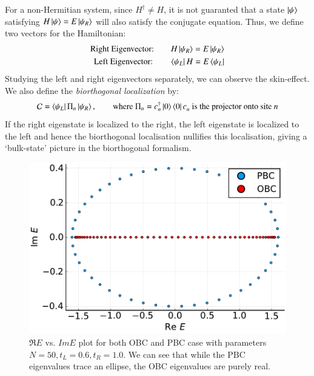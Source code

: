 For a non-Hermitian system, since $H^\dagger\neq H$, it is not guaranted that a state $\ket{\psi}$ satisfying $H\ket{\psi} = E\ket{\psi_R}$ will also satisfy the conjugate equation. Thus, we define two vectors for the Hamiltonian:
\begin{align*}
    \text{Right Eigenvector:\qquad} H\ket{\psi_R} = E\ket{\psi_R}\\
    \text{Left Eigenvector:\qquad} \bra{\psi_L} H = E \bra{\psi_L}
\end{align*}
Studying the left and right eigenvectors separately, we can observe the skin-effect. We also define the \textit{biorthogonal localization} by: $$\mathcal C = \bra{\psi_L}\Pi_n \ket{\psi_R}, \qquad \text{where } \Pi_n = c\y_n \ket{0}\bra{0}c\py_n \text{ is the projector onto site $n$}$$
If the right eigenstate is localized to the right, the left eigenstate is localized to the left and hence the biorthogonal localisation nullifies this localisation, giving a `bulk-state' picture in the biorthogonal formalism. 
\begin{figure}[H]
    \centering 
    \includegraphics[scale=0.5]{FIGS_MANUS_NHSE/E_pbc_obc.pdf}
    \caption{$\Re E$ vs. $Im E$ plot for both OBC and PBC case with parameters $N=50,t_L=0.6, t_R=1.0$. We can see that while the PBC eigenvalues trace an ellipse, the OBC eigenvalues are purely real.  }
\end{figure}

